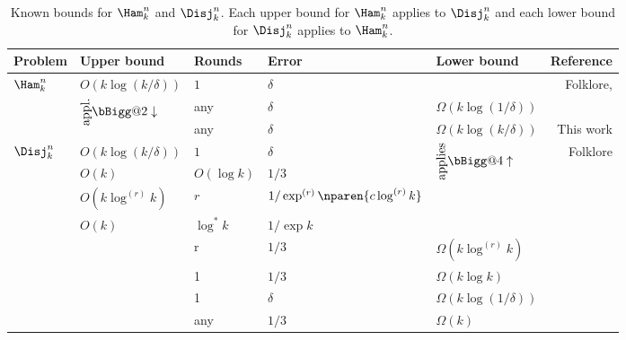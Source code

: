 \begin{table}[]
\def\arraystretch{1.2}
\makeatletter
\newcommand{\mleftarrow}{\rotatebox[origin=c]{90}{appl.}\bBigg@{2}\downarrow}
\newcommand{\mrightarro}{\rotatebox[origin=c]{90}{applies}\bBigg@{4}\uparrow}
\makeatother
\begin{tabular}{lllllr}
{\bf Problem}			& {\bf Upper bound}		& {\bf Rounds}			& {\bf Error}    			& {\bf Lower bound}		& {\bf Reference} \\\hline
\multirow{3}{*}{$\Ham^n_k$}	& $O(k\log (k/\delta))$		& $1$				& $\delta$				&				& Folklore, \cite{HuangSZZ2006}\\
				& \multirow{2}{*}{$\mleftarrow$}& any				& $\delta$				& $\Omega(k\log(1/\delta))$	& \cite{BlaisBG2014}\\
				&				& any				& $\delta$				& $\Omega(k\log(k/\delta))$ 	& This work\\
\hline
\multirow{8}{*}{$\Disj^n_k$}	& $O(k\log (k/\delta))$		& $1$				& $\delta$				& \multirow{4}{*}{$\mrightarro$}& Folklore          \\
				& $O(k)$			& $O(\log k)$			& $1/3$					&				& \cite{HastadW2007}\\
                              	& $O(k\log^{(r)}k)$		& $r$				& $1/\exp^{(r)}\nparen{c\log^{(r)} k}$	&				& \cite{SaglamT2013}\\
			      	& $O(k)$			& $\log^* k$			& $1/\exp k$				&				& \cite{SaglamT2013}\\
				&				& r				& $1/3$					& $\Omega(k \log^{(r)} k)$	& \cite{SaglamT2013}\\
				&				& 1				& $1/3$					& $\Omega(k\log k)$ 		& \cite{BuhrmanGMW2012, DasguptaKS12}\\
				&				& 1				& $\delta$				& $\Omega(k \log(1/\delta))$	& \cite{Saglam2011,JayramW2011}\\
				&				& any				& $1/3$					& $\Omega(k)$			& \cite{KalyanasundaramS1992}\\
\hline
\end{tabular}
\caption{Known bounds for $\Ham^n_k$ and $\Disj^n_k$. 
Each upper bound for $\Ham^{n}_k$ applies to $\Disj^n_k$ 
and each lower bound for $\Disj^n_k$ applies to $\Ham^n_k$.}
\label{table:hamvsdisj}
\end{table}
